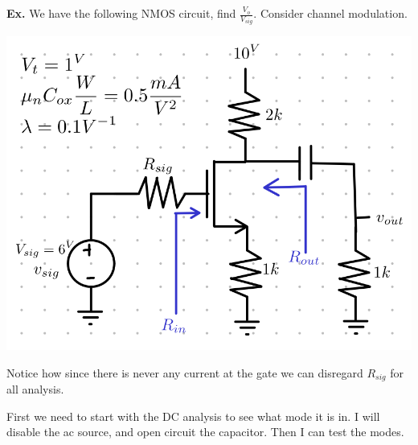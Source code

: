 \documentclass[12pt,letterpaper]{article} \usepackage{amsmath} \usepackage{graphicx} \usepackage[margin=1in]{geometry} \usepackage{longtable}  \usepackage{amssymb}
\begin{document}
	\begin{mdframed}
		\textbf{Ex. }We have the following NMOS circuit, find $\frac{V_o}{V_{sig}}$. Consider channel modulation. 
		\begin{center}
			\includegraphics[width=0.4\linewidth]{mosfet-ex}
		\end{center}
		Notice how since there is never any current at the gate we can disregard $R_{sig}$ for all analysis.
		
		First we need to start with the DC analysis to see what mode it is in. I will disable the ac source, and open circuit the capacitor. Then I can test the modes. 
		

\end{mdframed}
\end{document}
